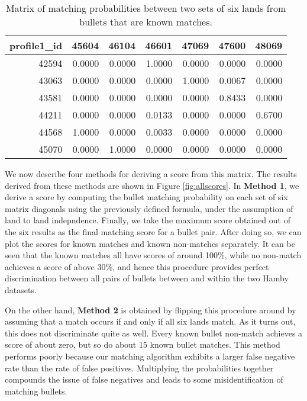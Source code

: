 \documentclass[12pt,]{article}
\theoremstyle{definition}
\theoremstyle{definition}
\theoremstyle{definition}
\theoremstyle{remark}
\begin{document}
\begin{table}[ht]
\centering
\begin{tabular}{rrrrrrr}
  \hline
profile1\_id & 45604 & 46104 & 46601 & 47069 & 47600 & 48069 \\ 
  \hline
42594 & 0.0000 & 0.0000 & 1.0000 & 0.0000 & 0.0000 & 0.0000 \\ 
  43063 & 0.0000 & 0.0000 & 0.0000 & 1.0000 & 0.0067 & 0.0000 \\ 
  43581 & 0.0000 & 0.0000 & 0.0000 & 0.0000 & 0.8433 & 0.0000 \\ 
  44211 & 0.0000 & 0.0000 & 0.0133 & 0.0000 & 0.0000 & 0.6700 \\ 
  44568 & 1.0000 & 0.0000 & 0.0033 & 0.0000 & 0.0000 & 0.0000 \\ 
  45070 & 0.0000 & 1.0000 & 0.0000 & 0.0000 & 0.0000 & 0.0000 \\ 
   \hline
\end{tabular}
\caption{Matrix of matching probabilities between two sets of six lands from bullets that are known matches.} 
\label{tab:diag}
\end{table}

We now describe four methods for deriving a score from this matrix. The
results derived from these methods are shown in Figure
\ref{fig:allscores}. In \textbf{Method 1}, we derive a score by
computing the bullet matching probability on each set of six matrix
diagonals using the previously defined formula, under the assumption of
land to land indepndence. Finally, we take the maximum score obtained
out of the six results as the final matching score for a bullet pair.
After doing so, we can plot the scores for known matches and known
non-matches separately. It can be seen that the known matches all have
scores of around 100\%, while no non-match achieves a score of above
30\%, and hence this procedure provides perfect discrimination between
all pairs of bullets between and within the two Hamby datasets.

On the other hand, \textbf{Method 2} is obtained by flipping this
procedure around by assuming that a match occurs if and only if all six
lands match. As it turns out, this does not discriminate quite as well.
Every known bullet non-match achieves a score of about zero, but so do
about 15 known bullet matches. This method performs poorly because our
matching algorithm exhibits a larger false negative rate than the rate
of false positives. Multiplying the probabilities together compounds the
issue of false negatives and leads to some misidentification of matching
bullets.
\end{document}
